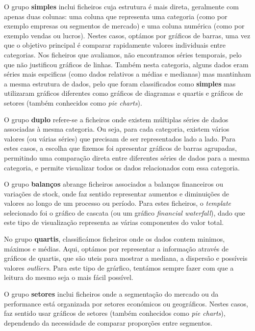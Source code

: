 O grupo \textbf{simples} inclui ficheiros cuja estrutura é mais direta, geralmente com apenas duas colunas: uma coluna que representa uma categoria (como por exemplo empresas ou segmentos de mercado) e uma coluna numérica (como por exemplo vendas ou lucros). Nestes casos, optámos por gráficos de barras, uma vez que o objetivo principal é comparar rapidamente valores individuais entre categorias. Nos ficheiros que avaliamos, não encontramos séries temporais, pelo que não justificou gráficos de linhas. Também nesta categoria, alguns dados eram séries mais espcificas (como dados relativos a médias e medianas) mas mantinham a mesma estrutura de dados, pelo que foram classificados como \textbf{simples} mas utilizaram gráficos diferentes como gráficos de diagramas e quartis e gráficos de setores (também conhecidos como \textit{pie charts}).

O grupo \textbf{duplo} refere-se a ficheiros onde existem múltiplas séries de dados associadas à mesma categoria. Ou seja, para cada categoria, existem vários valores (ou várias séries) que precisam de ser representados lado a lado. Para estes casos, a escolha que fizemos foi apresentar gráficos de barras agrupadas, permitindo uma comparação direta entre diferentes séries de dados para a mesma categoria, e permite visualizar todos os dados relacionados com essa categoria.

O grupo \textbf{balanços} abrange ficheiros associados a balanços financeiros ou variações de stock, onde faz sentido representar aumentos e diminuições de valores ao longo de um processo ou período. Para estes ficheiros, o \textit{template} selecionado foi o gráfico de cascata (ou um gráfico \textit{financial waterfall}), dado que este tipo de visualização representa as várias componentes do valor total.

No grupo \textbf{quartis}, classificámos ficheiros onde os dados contem minimos, máximos e médias. Aqui, optámos por representar a informação através de gráficos de quartis, que são uteis para mostrar a mediana, a dispersão e possíveis valores \textit{outliers}. Para este tipo de grárfico, tentámos sempre fazer com que a leitura do mesmo seja o mais fácil possível.

O grupo \textbf{setores} inclui ficheiros onde a segmentação do mercado ou da performance está organizada por setores económicos ou geográficos. Nestes casos, faz sentido usar gráficos de setores (também conhecidos como \textit{pie charts}),  dependendo da necessidade de comparar proporções entre segmentos.

